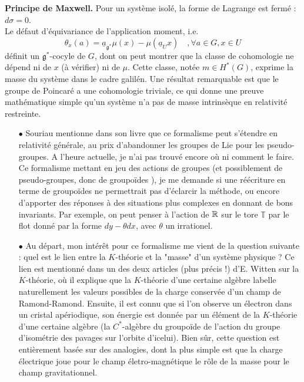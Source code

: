 \textbf{Principe de Maxwell.} Pour un système isolé, la forme de Lagrange est fermé : $d\sigma  =0$.\\

Le défaut d'équivariance de l'application moment, i.e. 
\[\theta_x(a) = \underline{a}_{\mathfrak g^*} \mu(x)-\mu(\underline{a}_Ux)\quad ,\forall a\in G,x\in U \]
définit un $\mathfrak g^*$-cocyle de $G$, dont on peut montrer que la classe de cohomologie ne dépend ni de $x$ (à vérifier) ni de $\mu$. Cette classe, notée $m\in H^*(G)$, exprime la masse du système dans le cadre galilén. Une résultat remarquable est que le groupe de Poincaré a une cohomologie triviale, ce qui donne une preuve mathématique simple qu'un système n'a pas de masse intrinsèque en relativité restreinte.\\

\begin{itemize}
\item[$\bullet$] Souriau mentionne dans son livre que ce formalisme peut s'étendre en relativité générale, au prix d'abandonner les groupes de Lie pour les pseudo-groupes. A l'heure actuelle, je n'ai pas trouvé encore où ni comment le faire. Ce formalisme mettant en jeu des actions de groupes (et possiblement de pseudo-groupes, donc de groupoïdes ), je me demande si une réécriture en terme de groupoïdes ne permettrait pas d'éclarcir la méthode, ou encore d'apporter des réponses à des situations plus complexes en donnant de bons invariants. Par exemple, on peut penser à l'action de $\mathbb R$ sur le tore $\mathbb T$ par le flot donné par la forme $dy-\theta dx$, avec $\theta$ un irrationel.

\item[$\bullet$] Au départ, mon intérêt pour ce formalisme me vient de la question suivante : quel est le lien entre la $K$-théorie et la "masse" d'un système physique ? Ce lien est mentionné dans un des deux articles (plus précis !) d'E. Witten sur la $K$-théorie, où il explique que la $K$-théorie d'une certaine algèbre labelle naturellement les valeurs possibles de la charge conservée d'un champ de Ramond-Ramond. Ensuite, il est connu que si l'on observe un électron dans un cristal apériodique, son énergie est donnée par un élément de la $K$-théorie d'une certaine algèbre (la $C^*$-algèbre du groupoïde de l'action du groupe d'isométrie des pavages sur l'orbite d'icelui). Bien sûr, cette question est entièrement basée sur des analogies, dont la plus simple est que la charge électrique joue pour le champ életro-magnétique le rôle de la masse pour le champ gravitationnel. 
\end{itemize}

